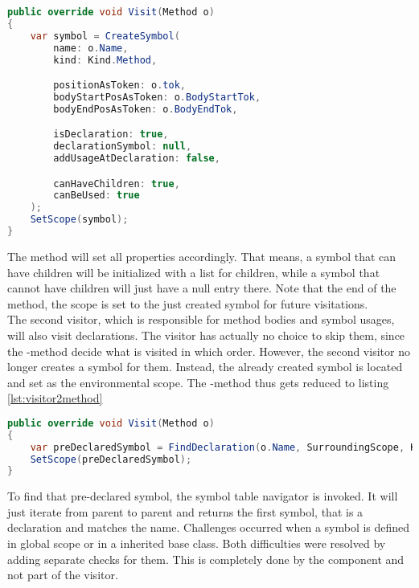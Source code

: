 \begin{lstlisting}[language=csharp, caption={Visiting a Method, First Visitor}, captionpos=b, label={lst:visitorvisit1}]
public override void Visit(Method o)
{
    var symbol = CreateSymbol(
        name: o.Name,
        kind: Kind.Method,

        positionAsToken: o.tok,
        bodyStartPosAsToken: o.BodyStartTok,
        bodyEndPosAsToken: o.BodyEndTok,

        isDeclaration: true,
        declarationSymbol: null,
        addUsageAtDeclaration: false,

        canHaveChildren: true,
        canBeUsed: true
    );
    SetScope(symbol);
}
\end{lstlisting}

The  method will set all properties accordingly.
That means, a symbol that can have children will be initialized with a list for children,
while a symbol that cannot have children will just have a null entry there.
Note that the end of the method, the scope is set to the just created symbol for future visitations.\\

The second visitor, which is responsible for method bodies and symbol usages,
will also visit declarations.
The visitor has actually no choice to skip them, since the -method decide what is visited in which order.
However, the second visitor no longer creates a symbol for them.
Instead, the already created symbol is located and set as the environmental scope.
The -method thus gets reduced to listing \ref{lst:visitor2method}

\begin{lstlisting}[language=csharp, caption={Visiting a Method, Second Visitor}, captionpos=b, label={lst:visitor2method}]
public override void Visit(Method o)
{
    var preDeclaredSymbol = FindDeclaration(o.Name, SurroundingScope, Kind.Method);
    SetScope(preDeclaredSymbol);
}
\end{lstlisting}

To find that pre-declared symbol, the symbol table navigator is invoked.
It will just iterate from parent to parent and returns the first symbol, that is a declaration and matches the name.
Challenges occurred when a symbol is defined in global scope or in a inherited base class.
Both difficulties were resolved by adding separate checks for them.
This is completely done by the  component and not part of the visitor.

